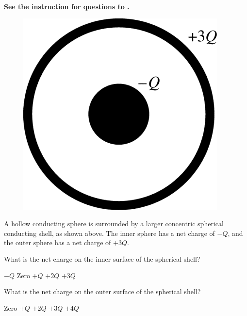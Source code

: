 \textbf{See the instruction for questions  to .}

\begin{figure}[H]
    \centering
    \includegraphics[scale=0.4]{images/img-013-020.png}
\end{figure}

A hollow conducting sphere is surrounded by a larger concentric spherical conducting shell, as shown above. The inner sphere has a net charge of $-Q$, and the outer sphere has a net charge of $+3 Q$.

\begin{questions}\setcounter{question}{26}\question
What is the net charge on the inner surface of the spherical shell?

\begin{oneparchoices}
\choice $-Q$
\choice Zero
\choice $+Q$
\choice $+2Q$
\choice $+3Q$
\end{oneparchoices}\end{questions}

\begin{questions}\setcounter{question}{27}\question
What is the net charge on the outer surface of the spherical shell?

\begin{oneparchoices}
\choice Zero
\choice $+Q$
\choice $+2Q$
\choice $+3Q$
\choice $+4Q$
\end{oneparchoices}\end{questions}

